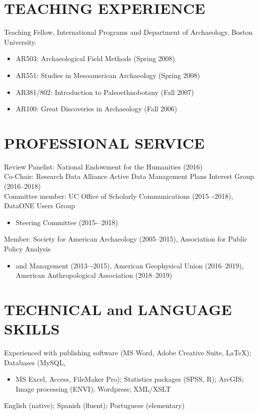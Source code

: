 \documentclass[10pt,centered]{res} %
\begin{document}
\begin{resume}
\section{\color{ResumeBlue}TEACHING EXPERIENCE}
Teaching Fellow, International Programs and Department of Archaeology, Boston University.
\begin{itemize}
 \item[]AR503: Archaeological Field Methods (Spring 2008)
 \vspace*{-.1cm}
 \item[]AR551: Studies in Mesoamerican Archaeology (Spring 2008)
 \vspace*{-.1cm}
 \item[]AR381/802: Introduction to Paleoethnobotany (Fall 2007)
 \vspace*{-.1cm}
 \item[]AR100: Great Discoveries in Archaeology (Fall 2006)
\end{itemize}

\section{\color{ResumeBlue}PROFESSIONAL SERVICE}
Review Panelist: National Endowment for the Humanities (2016) \\
Co-Chair: Research Data Alliance Active Data Management Plans Interest Group (2016--2018)\\
\newpage
Committee member: UC Office of Scholarly Communications (2015–-2018), DataONE Users Group
\begin{itemize}
\item[]
Steering Committee (2015-–2018)
\end{itemize}
\vspace*{-1em}
Member: Society for American Archaeology (2005--2015), Association for Public Policy Analysis
\begin{itemize}
\item[]
and Management (2013–-2015), American Geophysical Union (2016--2019), American Anthropological Association (2018--2019)
\end{itemize}

\section{\color{ResumeBlue}TECHNICAL and LANGUAGE SKILLS}
Experienced with publishing software (MS Word, Adobe Creative Suite, LaTeX); Databases (MySQL,
\begin{itemize}
\item[]  MS Excel, Access, FileMaker Pro); Statistics packages (SPSS, R); ArcGIS; Image processing (ENVI); Wordpress; XML/XSLT
\end{itemize}
\vspace*{-1em}
English (native); Spanish (fluent); Portuguese (elementary)
\end{resume}
\end{document}
